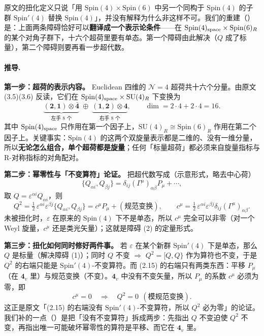 原文的扭化定义只说「用 $\mathrm{Spin}(4)\times\mathrm{Spin}(6)$ 中另一个同构于 $\mathrm{Spin}(4)$ 的子群 $\mathrm{Spin}'(4)$ 替换 $\mathrm{Spin}(4)$」\pA{}，并没有解释为什么非这样不可。我们的重建（\pB）是：上面两条障碍恰好可以\textbf{翻译成一个表示论条件}——在 $\mathrm{Spin}(4)_{\rm space}\times\mathrm{Spin}(6)_R$ 的某个对角子群下，十六个超荷里要有单态。第一个障碍由此解决（$Q$ 成了标量），第二个障碍则要再看一步超代数。

\paragraph{推导.}

\textbf{第一步：超荷的表示内容。} Euclidean 四维的 $\mathcal N=4$ 超荷共十六个分量。由原文 (3.5)(3.6) 反读，它们在 $\mathrm{Spin}(4)_{\rm space}\times\mathrm{SU}(4)_R$ 下变换为\pB{}
\begin{equation}
\underbrace{\mathbf{(2,1)}\otimes\bar{\mathbf 4}}_{\text{左手 }8\text{ 个}}\;\oplus\;\underbrace{\mathbf{(1,2)}\otimes\mathbf 4}_{\text{右手 }8\text{ 个}},
\qquad \dim=2\cdot 4+2\cdot 4=16 .
\label{eq:sixteen}
\end{equation}
其中 $\mathrm{Spin}(4)_{\rm space}$ 只作用在第一个因子上，$\mathrm{SU}(4)_R\cong\mathrm{Spin}(6)_R$ 作用在第二个因子上。关键事实：$\mathrm{Spin}(4)$ 的这两个双旋量表示都是二维的、没有一维分量，所以\textbf{无论怎么组合，单个超荷都是旋量}；任何「标量超荷」都必须来自旋量指标与 R-对称指标的对角配对\pB。

\textbf{第二步：幂零性与「不变算符」论证。} 把超代数写成（示意形式，略去中心荷）\pB
\begin{equation}
\{Q_{\alpha i},Q_{\beta j}\}=\delta_{ij}(\Gamma^\mu)_{\alpha\beta}P_\mu+\cdots,
\label{eq:susyalg}
\end{equation}
取 $Q=\varepsilon^{\alpha i}Q_{\alpha i}$，则
\begin{equation}
Q^2=\tfrac12\,\varepsilon^{\alpha i}\varepsilon^{\beta j}\{Q_{\alpha i},Q_{\beta j}\}
=c^\mu P_\mu+(\text{规范变换}),
\qquad
c^\mu=\tfrac12\,\varepsilon^{\alpha i}\varepsilon^{\beta j}\delta_{ij}(\Gamma^\mu)_{\alpha\beta}.
\label{eq:Qsq}
\end{equation}
未被扭化时，$\varepsilon$ 在原来的 $\mathrm{Spin}(4)$ 下不是单态，所以 $c^\mu$ 完全可以非零（对一个 Weyl 旋量，$c^\mu$ 还是类光矢量）；这就是障碍 (2) 的定量形式\pB。

\textbf{第三步：扭化如何同时修好两件事。} 若 $\varepsilon$ 在某个新群 $\mathrm{Spin}'(4)$ 下是单态，那么 $Q$ 是标量（解决障碍 (1)）；同时 $Q$ 不变 $\Rightarrow$ $Q^2=[Q,Q\}$ 作为算符也不变，于是 $Q^2$ 的右端只能是 $\mathrm{Spin}'(4)$-不变算符。而 (2.15) 的右端只有两类东西：平移 $P_\mu$（在 $\mathbf 4_v$ 里）与规范变换（不变）。$\mathbf 4_v$ 中没有不变矢量，所以 $P_\mu$ 的系数 $c^\mu$ 必须为零，即
\begin{equation}
c^\mu=0\quad\Longrightarrow\quad Q^2=0\ \ (\text{模规范变换}).
\label{eq:Qnilpotent}
\end{equation}
这正是原文「(2.15) 的右端没有 $\mathrm{Spin}'(4)$-不变算符，所以 $Q^2$ 必为零」的论证\pA{}。我们补的一点（\pB）是把「没有不变算符」拆成两步：先指出 $Q$ 不变迫使 $Q^2$ 不变，再指出唯一可能破坏幂零性的算符是平移、而它在 $\mathbf 4_v$ 里。

